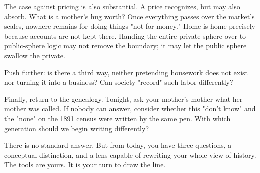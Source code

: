 The case against pricing is also substantial. A price recognizes, but may also absorb. What is a mother's hug worth? Once everything passes over the market's scales, nowhere remains for doing things "not for money." Home is home precisely because accounts are not kept there. Handing the entire private sphere over to public-sphere logic may not remove the boundary; it may let the public sphere swallow the private.

Push further: is there a third way, neither pretending housework does not exist nor turning it into a business? Can society "record" such labor differently?

Finally, return to the genealogy. Tonight, ask your mother's mother what her mother was called. If nobody can answer, consider whether this "don't know" and the "none" on the 1891 census were written by the same pen. With which generation should we begin writing differently?

There is no standard answer. But from today, you have three questions, a conceptual distinction, and a lens capable of rewriting your whole view of history. The tools are yours. It is your turn to draw the line.
